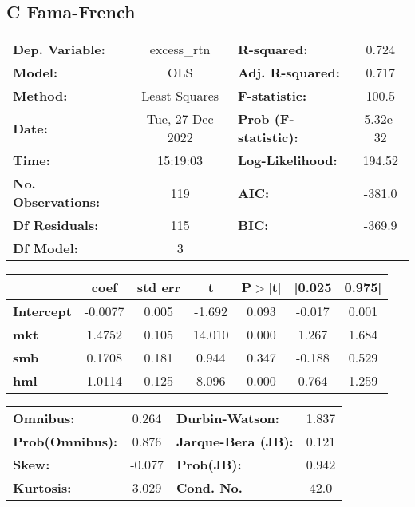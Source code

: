 \documentclass{report}
\begin{document}
\subsection{C Fama-French}

\begin{center}
\begin{tabular}{lclc}
\toprule
\textbf{Dep. Variable:}    &   excess\_rtn    & \textbf{  R-squared:         } &     0.724   \\
\textbf{Model:}            &       OLS        & \textbf{  Adj. R-squared:    } &     0.717   \\
\textbf{Method:}           &  Least Squares   & \textbf{  F-statistic:       } &     100.5   \\
\textbf{Date:}             & Tue, 27 Dec 2022 & \textbf{  Prob (F-statistic):} &  5.32e-32   \\
\textbf{Time:}             &     15:19:03     & \textbf{  Log-Likelihood:    } &    194.52   \\
\textbf{No. Observations:} &         119      & \textbf{  AIC:               } &    -381.0   \\
\textbf{Df Residuals:}     &         115      & \textbf{  BIC:               } &    -369.9   \\
\textbf{Df Model:}         &           3      & \textbf{                     } &             \\
\bottomrule
\end{tabular}
\begin{tabular}{lcccccc}
                   & \textbf{coef} & \textbf{std err} & \textbf{t} & \textbf{P$> |$t$|$} & \textbf{[0.025} & \textbf{0.975]}  \\
\midrule
\textbf{Intercept} &      -0.0077  &        0.005     &    -1.692  &         0.093        &       -0.017    &        0.001     \\
\textbf{mkt}       &       1.4752  &        0.105     &    14.010  &         0.000        &        1.267    &        1.684     \\
\textbf{smb}       &       0.1708  &        0.181     &     0.944  &         0.347        &       -0.188    &        0.529     \\
\textbf{hml}       &       1.0114  &        0.125     &     8.096  &         0.000        &        0.764    &        1.259     \\
\bottomrule
\end{tabular}
\begin{tabular}{lclc}
\textbf{Omnibus:}       &  0.264 & \textbf{  Durbin-Watson:     } &    1.837  \\
\textbf{Prob(Omnibus):} &  0.876 & \textbf{  Jarque-Bera (JB):  } &    0.121  \\
\textbf{Skew:}          & -0.077 & \textbf{  Prob(JB):          } &    0.942  \\
\textbf{Kurtosis:}      &  3.029 & \textbf{  Cond. No.          } &     42.0  \\
\bottomrule
\end{tabular}
\end{center}
\end{document}
